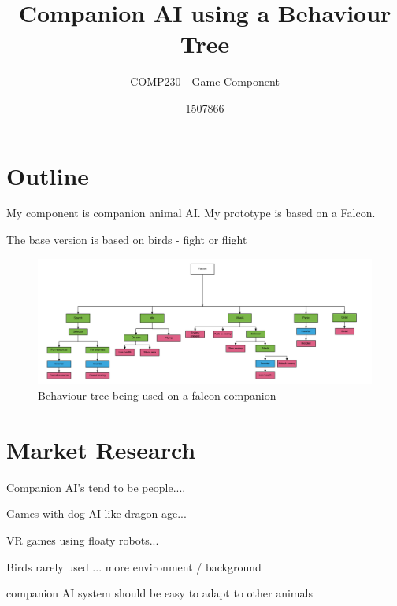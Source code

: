 \documentclass{scrartcl}
\title{ Companion AI using a Behaviour Tree }
\subtitle{COMP230 - Game Component}
\author{1507866}
\begin{document}
	
\maketitle
	
\section{Outline}
My component is companion animal AI. My prototype is based on a Falcon.


The base version is based on birds - fight or flight


\begin{figure}[h]
	\includegraphics[width=1.2\linewidth]{behaviour_tree.png}
	\caption{ Behaviour tree being used on a falcon companion}
\end{figure} 


\section{Market Research}
Companion AI's tend to be people....

Games with dog AI like dragon age...

VR games using floaty robots...

Birds rarely used ... more environment / background

companion AI system 
should be easy to adapt to other animals


%
	
\end{document}
